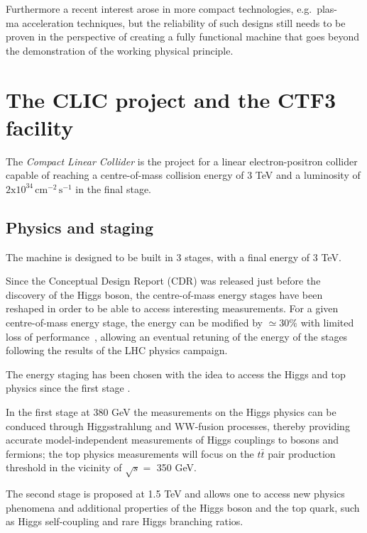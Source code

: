 Furthermore a recent interest arose in more compact technologies, e.g.~plas-\\ma acceleration techniques, but the reliability of such designs still needs to be proven in the perspective of creating a fully functional machine that goes beyond the demonstration of the working physical principle.



\section{The CLIC project and the CTF3 facility}

The \textit{Compact Linear Collider} is the project for a linear electron-positron collider capable of reaching a centre-of-mass collision energy of 3 TeV and a luminosity of $2\text{x}10^{34} \, \text{cm}^{-2} \, \text{s}^{-1}$ in the final stage.

\subsection{Physics and staging}

The machine is designed to be built in 3 stages, with a final energy of 3 TeV. 

Since the Conceptual Design Report (CDR)\cite{CLIC:cdr} was released just before the discovery of the Higgs boson, the centre-of-mass energy stages have been reshaped in order to be able to access interesting measurements. For a given centre-of-mass energy stage, the energy can be modified by $\simeq 30\%$ with limited loss of performance~\cite{CLIC:cdrVol3}, allowing an eventual retuning of the energy of the stages following the results of the LHC physics campaign.

The energy staging has been chosen with the idea to access the Higgs and top physics since the first stage \cite{CLIC:staging2016,Bozovic-Jelisavcic:2160172}.

In the first stage at 380 GeV the measurements on the Higgs physics can be conduced through Higgsstrahlung and WW-fusion processes, thereby providing accurate model-independent measurements of Higgs couplings to bosons and fermions\cite{Roloff:2210491}; the top physics measurements will focus on the $t\bar{t}$ pair production threshold in the vicinity of $\sqrt{s} = $ 350 GeV.

The second stage is proposed at 1.5 TeV and allows one to access new physics phenomena and additional properties of the Higgs boson and the top quark, such as Higgs self-coupling and rare Higgs branching ratios.

